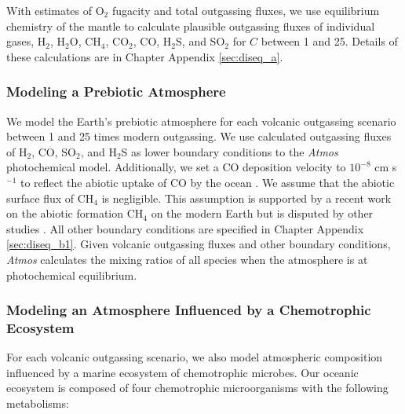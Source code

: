With estimates of O$_2$ fugacity and total outgassing fluxes, we use equilibrium chemistry of the mantle to calculate plausible outgassing fluxes of individual gases, H$_2$, H$_2$O, CH$_4$, CO$_2$, CO, H$_2$S, and SO$_2$ for $C$ between 1 and 25. Details of these calculations are in Chapter Appendix \ref{sec:diseq_a}.

\subsubsection{Modeling a Prebiotic Atmosphere}

We model the Earth's prebiotic atmosphere for each volcanic outgassing scenario between 1 and 25 times modern outgassing. We use calculated outgassing fluxes of H$_2$, CO, SO$_2$, and H$_2$S as lower boundary conditions to the \textit{Atmos} photochemical model. Additionally, we set a CO deposition velocity to $10^{-8}$ cm s$^{-1}$ to reflect the abiotic uptake of CO by the ocean \citep{Kharecha_2005}. We assume that the abiotic surface flux of CH$_4$ is negligible. This assumption is supported by a recent work on the abiotic formation CH$_4$ on the modern Earth \citep{Fiebig_2019} but is disputed by other studies \citep{Etiope_2013}. All other boundary conditions are specified in Chapter Appendix \ref{sec:diseq_b1}. Given volcanic outgassing fluxes and other boundary conditions, \textit{Atmos} calculates the mixing ratios of all species when the atmosphere is at photochemical equilibrium.

\subsubsection{Modeling an Atmosphere Influenced by a Chemotrophic Ecosystem}

For each volcanic outgassing scenario, we also model atmospheric composition influenced by a marine ecosystem of chemotrophic microbes. Our oceanic ecosystem is composed of four chemotrophic microorganisms with the following metabolisms:

